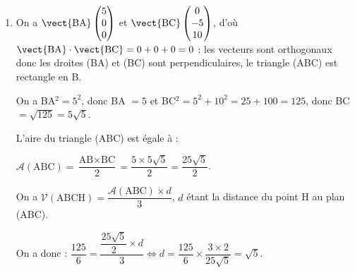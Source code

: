 \begin{enumerate}
\begin{enumerate}
		$\mathcal{V}(\text{ABCH}) = \dfrac{\mathcal{A}(\text{ABH}) \times \text{CO}}{3} = \dfrac{\frac{25}{4} \times 10}{3} = \dfrac{125}{6}$.
	\end{enumerate}
\item On a $\vect{\text{BA}}\begin{pmatrix}5\\0\\0\end{pmatrix}$ et $\vect{\text{BC}}\begin{pmatrix}0\\-5\\10\end{pmatrix}$, d'où $\vect{\text{BA}} \cdot \vect{\text{BC}} = 0 + 0 + 0 = 0$ : les vecteurs sont orthogonaux donc les droites (BA) et (BC) sont perpendiculaires, le triangle (ABC) est rectangle en B.

On a BA$^2 = 5^2$, donc BA $ = 5$ et BC$^2 = 5^2 + 10^2 = 25 + 100 = 125$, donc BC $= \sqrt{125} = 5 \sqrt 5$.

L'aire du triangle (ABC) est égale à :

$\mathcal{A}(\text{ABC}) = \dfrac{\text{AB} \times \text{BC}}{2} = \dfrac{ 5 \times 5 \sqrt 5}{2} = \dfrac{25\sqrt 5}{2}$.

On a $\mathcal{V}(\text{ABCH}) = \dfrac{\mathcal{A}(\text{ABC}) \times d}{3}$, $d$ étant la distance du point H au plan (ABC).

On a donc : $\dfrac{125}{6} = \dfrac{\dfrac{25\sqrt 5}{2} \times d}{3} \iff d = \dfrac{125}{6} \times \dfrac{3 \times 2}{25\sqrt 5} = \sqrt 5$.
\end{enumerate}

\bigskip

